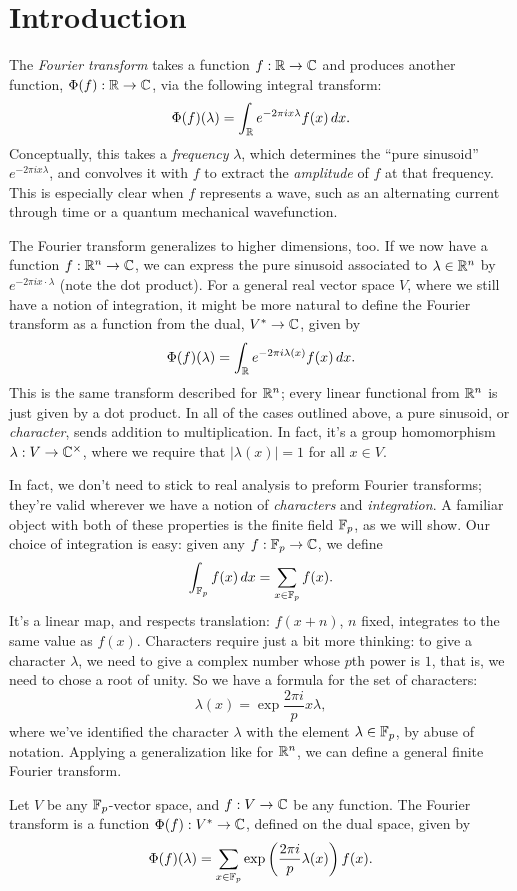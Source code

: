 \section{Introduction}\label{sec:intro}

The \emph{Fourier transform} takes a function $f:\mathbb{R}\to\mathbb{C}$ and produces another
function, $\Phi(f):\mathbb{R}\to\mathbb{C}$, via the following integral transform:
\[ \Phi(f)(\lambda) = \int_{\mathbb{R}} e^{-2\pi i x \lambda} f(x)\, dx. \]
Conceptually, this takes a \emph{frequency} $\lambda$, which determines the ``pure sinusoid''
$e^{-2\pi i x \lambda}$, and convolves it with $f$ to extract the \emph{amplitude} of $f$ 
at that frequency. This is especially clear when $f$ represents a wave, such as an alternating
current through time or a quantum mechanical wavefunction. 

The Fourier transform generalizes to higher dimensions, too. If we now have a function
$f:\mathbb{R}^n\to\mathbb{C}$, we can express the pure sinusoid associated to $\lambda\in\mathbb{R}^n$ by 
$e^{-2\pi i x\cdot\lambda}$ (note the dot product). For a general real vector space $V$, where
we still have a notion of integration, it might be more natural to define the 
Fourier transform as a function from the dual, $V^* \to \mathbb{C}$, given by
\[ \Phi(f)(\lambda) = \int_{\mathbb{R}} e^{-2\pi i \lambda(x)} f(x)\, dx. \]
This is the same transform described for $\mathbb{R}^n$; every linear functional from $\mathbb{R}^n$ is
just given by a dot product. In all of the cases outlined above, a pure sinusoid, or
\emph{character}, sends addition to multiplication. In fact, it's a group homomorphism 
$\lambda:V \to \mathbb{C}^\times$, where we require that $|\lambda(x)| = 1$ for all $x\in V$.

In fact, we don't need to stick to real analysis to preform Fourier transforms; they're
valid wherever we have a notion of \emph{characters}
and \emph{integration}. A familiar object with both of these properties is the finite field
$\mathbb{F}_p$, as we will show. Our choice of integration is easy: given any $f:\mathbb{F}_p\to\mathbb{C}$, we define
\[ \int_{\mathbb{F}_p} f(x)\, dx = \sum_{x\in\mathbb{F}_p} f(x). \]
It's a linear map, and respects translation: $f(x + n)$, $n$ fixed, integrates to the 
same value as $f(x)$. Characters require just a bit more thinking: to give a character 
$\lambda$, we need to give a complex number whose $p$th power is $1$, that is, we need
to chose a root of unity. So we have a formula for the set of characters:
\[ \lambda(x) = \exp {\frac{2\pi i}{p} x \lambda}, \]
where we've identified the character $\lambda$ with the element $\lambda\in\mathbb{F}_p$, by
abuse of notation. Applying a generalization like for $\mathbb{R}^n$, we can define a general
finite Fourier transform.
\begin{defn}
    Let $V$ be any $\mathbb{F}_p$-vector space, and $f:V\to \mathbb{C}$ be any function. The Fourier
    transform is a function $\Phi(f):V^*\to\mathbb{C}$, defined on the dual space, given by
    \[ \Phi(f)(\lambda) = 
        \sum_{x\in\mathbb{F}_p} \exp \left(\frac{2\pi i}{p} \lambda(x)\right) f(x). \]
\end{defn}


